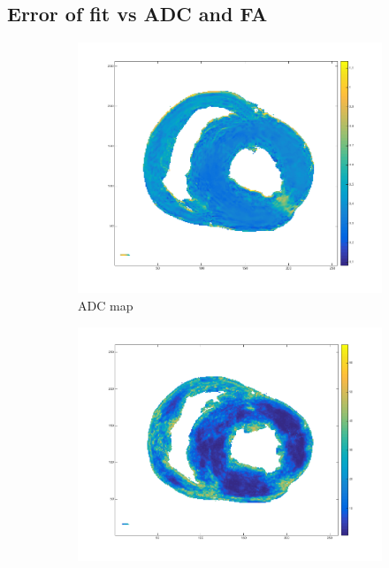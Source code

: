 \subsection{Error of fit vs ADC and FA}

\begin{figure}[h!]
    \centering
    \begin{subfigure}{.31\textwidth}
        \includegraphics[width=\textwidth]{figures/pig2_adc_31}
        \caption{ADC map}
        \label{fig:pig2_adc}
    \end{subfigure}
    \begin{subfigure}{.31\textwidth}
        \includegraphics[width=\textwidth]{figures/pig2_err_31}

\end{subfigure}
\end{figure}
